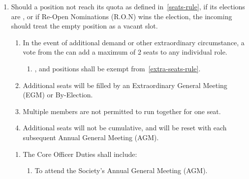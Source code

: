 \documentclass[a4paper,11pt,parskip=half-]{scrartcl} %
\begin{document}
\begin{enumerate}
\begin{enumerate}
                \item Additional positions should be filled in accordance with~\ref{vacant-rule}.
            \end{enumerate}

        \item\label{vacant-rule} Should a position not reach its quota as defined in~\ref{seats-rule}, if its elections are , or if Re-Open Nominations (R.O.N) wins the election, the incoming \exec should treat the empty position as a vacant slot.

            \begin{enumerate}
                \item\label{extra-seats-rule} In the event of additional demand or other extraordinary circumstance, a  vote from the \exec can add a maximum of 2 seats to any individual role.
                    \begin{enumerate}
                        \item {},  and  positions shall be exempt from~\ref{extra-seats-rule}.
                    \end{enumerate}

                \item Additional seats will be filled by an Extraordinary General Meeting (EGM) or By-Election.

                \item Multiple members are not permitted to run together for one seat.

                \item Additional seats will not be cumulative, and will be reset with each subsequent Annual General Meeting (AGM).
            \end{enumerate}

            \begin{enumerate}
                \item The Core Officer Duties shall include:
                \begin{enumerate}
                    \item To attend the Society's Annual General Meeting (AGM).


\end{enumerate}
\end{enumerate}
\end{enumerate}
\end{document}
